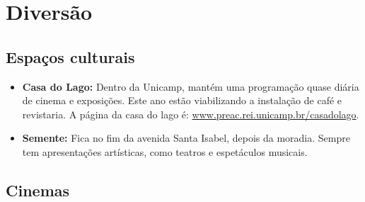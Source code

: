 
\section{Diversão}
\subsection{Espaços culturais}

\begin{itemize}
    \item   \textbf{Casa do Lago:} Dentro da Unicamp, mantém uma programação
        quase diária de cinema e exposições. Este ano estão viabilizando a
        instalação de café e revistaria. A página da casa do lago é:
        \url{www.preac.rei.unicamp.br/casadolago}.

    \item   \textbf{Semente:} Fica no fim da avenida Santa Isabel, depois da
        moradia. Sempre tem apresentações artísticas, como teatros e espetáculos
        musicais.
\end{itemize}

\subsection{Cinemas}

